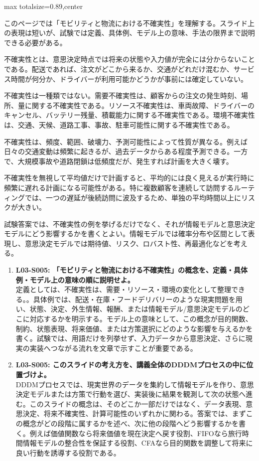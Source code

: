 \begin{minipage}[t]{0.58\textwidth}
\begin{adjustbox}{max totalsize={\textwidth}{0.89\textheight},center}
\begin{minipage}{\textwidth}\scriptsize
{}このページでは「モビリティと物流における不確実性」を理解する。スライド上の表現は短いが、試験では定義、具体例、モデル上の意味、手法の限界まで説明できる必要がある。\par
不確実性とは、意思決定時点では将来の状態や入力値が完全には分からないことである。配送であれば、注文がどこから来るか、交通がどれだけ混むか、サービス時間が何分か、ドライバーが利用可能かどうかが事前には確定していない。\par
不確実性は一種類ではない。需要不確実性は、顧客からの注文の発生時刻、場所、量に関する不確実性である。リソース不確実性は、車両故障、ドライバーのキャンセル、バッテリー残量、積載能力に関する不確実性である。環境不確実性は、交通、天候、道路工事、事故、駐車可能性に関する不確実性である。\par
不確実性は、頻度、範囲、破壊力、予測可能性によって性質が異なる。例えば日々の交通変動は頻繁に起きるが、過去データからある程度予測できる。一方で、大規模事故や道路閉鎖は低頻度だが、発生すれば計画を大きく壊す。\par
不確実性を無視して平均値だけで計画すると、平均的には良く見えるが実行時に頻繁に遅れる計画になる可能性がある。特に複数顧客を連続して訪問するルーティングでは、一つの遅延が後続訪問に波及するため、単独の平均時間以上にリスクが大きい。\par
試験答案では、不確実性の例を挙げるだけでなく、それが情報モデルと意思決定モデルにどう影響するかを書くとよい。情報モデルでは確率分布や区間として表現し、意思決定モデルでは期待値、リスク、ロバスト性、再最適化などを考える。\par{}\begin{enumerate}\item \textbf{L03-S005: 「モビリティと物流における不確実性」の概念を、定義・具体例・モデル上の意味の順に説明せよ。}\\定義としては、不確実性は、需要・リソース・環境の変化として整理できる。。具体例では、配送・在庫・フードデリバリーのような現実問題を用い、状態、決定、外生情報、報酬、または情報モデル/意思決定モデルのどこに対応するかを明示する。モデル上の意味として、この概念が目的関数、制約、状態表現、将来価値、または方策選択にどのような影響を与えるかを書く。試験では、用語だけを列挙せず、入力データから意思決定、さらに現実の実装へつながる流れを文章で示すことが重要である。\item \textbf{L03-S005: このスライドの考え方を、講義全体のDDDMプロセスの中に位置づけよ。}\\DDDMプロセスでは、現実世界のデータを集約して情報モデルを作り、意思決定モデルまたは方策で行動を選び、実装後に結果を観測して次の状態へ進む。このスライドの概念は、そのどこか一部だけではなく、データ表現、意思決定、将来不確実性、計算可能性のいずれかに関わる。答案では、まずこの概念がどの段階に属するかを述べ、次に他の段階へどう影響するかを書く。例えば価値関数なら将来価値を現在決定へ戻す役割、FIFOなら旅行時間情報モデルの整合性を保証する役割、CFAなら目的関数を調整して将来に良い行動を誘導する役割である。\end{enumerate}

\end{minipage}
\end{adjustbox}
\end{minipage}
